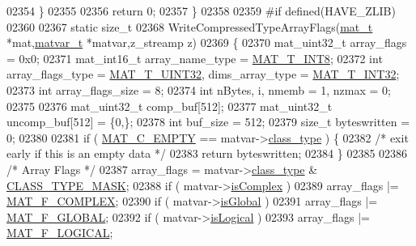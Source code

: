 \begin{DoxyCode}
{{{{{{{{{{{{{{{{02354     \}
02355 
02356     \textcolor{keywordflow}{return} 0;
02357 \}
02358 
02359 \textcolor{preprocessor}{#if defined(HAVE\_ZLIB)}
02360 
02367 \textcolor{keyword}{static} \textcolor{keywordtype}{size\_t}
02368 WriteCompressedTypeArrayFlags(\hyperlink{struct__mat__t}{mat\_t} *mat,\hyperlink{group___m_a_t_structmatvar__t}{matvar\_t} *matvar,z\_streamp z)
02369 \{
02370     mat\_uint32\_t array\_flags = 0x0;
02371     mat\_int16\_t  array\_name\_type = \hyperlink{group___m_a_t_ggacf7b3b879282b7ab3a51190e49bf3453a9807f5033ed4f9b548953742d9fd1658}{MAT\_T\_INT8};
02372     \textcolor{keywordtype}{int} array\_flags\_type = \hyperlink{group___m_a_t_ggacf7b3b879282b7ab3a51190e49bf3453aa397e285a23fe240368b752897652c6a}{MAT\_T\_UINT32}, dims\_array\_type = 
      \hyperlink{group___m_a_t_ggacf7b3b879282b7ab3a51190e49bf3453a83e06a68320726c6572bfbb9f3addb1d}{MAT\_T\_INT32};
02373     \textcolor{keywordtype}{int} array\_flags\_size = 8;
02374     \textcolor{keywordtype}{int} nBytes, i, nmemb = 1, nzmax = 0;
02375 
02376     mat\_uint32\_t comp\_buf[512];
02377     mat\_uint32\_t uncomp\_buf[512] = \{0,\};
02378     \textcolor{keywordtype}{int} buf\_size = 512;
02379     \textcolor{keywordtype}{size\_t} byteswritten = 0;
02380 
02381     \textcolor{keywordflow}{if} ( \hyperlink{group___m_a_t_ggad4d60ae7b709fc81bfd744fb4c857c40a5c76eef0ca0373d25abe49053be6fa9a}{MAT\_C\_EMPTY} == matvar->\hyperlink{group___m_a_t_aff13035bf3265dd7d9425e5d40c839d4}{class\_type} ) \{
02382         \textcolor{comment}{/* exit early if this is an empty data */}
02383         \textcolor{keywordflow}{return} byteswritten;
02384     \}
02385 
02386     \textcolor{comment}{/* Array Flags */}
02387     array\_flags = matvar->\hyperlink{group___m_a_t_aff13035bf3265dd7d9425e5d40c839d4}{class\_type} & \hyperlink{mat5_8c_a24b94e17e9c34b9c795798099c710751}{CLASS\_TYPE\_MASK};
02388     \textcolor{keywordflow}{if} ( matvar->\hyperlink{group___m_a_t_aeb03b3a69f108dc05470b00443a43739}{isComplex} )
02389         array\_flags |= \hyperlink{group___m_a_t_ggab9d6ef9e3ddca78a317b173f01d53fbbacd7b091a11184aad7fc6078c04470780}{MAT\_F\_COMPLEX};
02390     \textcolor{keywordflow}{if} ( matvar->\hyperlink{group___m_a_t_af26c71c4c0ddb14931d15910dddac1bc}{isGlobal} )
02391         array\_flags |= \hyperlink{group___m_a_t_ggab9d6ef9e3ddca78a317b173f01d53fbba49084e0c796aa7963e53f7539525d40d}{MAT\_F\_GLOBAL};
02392     \textcolor{keywordflow}{if} ( matvar->\hyperlink{group___m_a_t_a866c1539e68073a837833d74cd4a65be}{isLogical} )
02393         array\_flags |= \hyperlink{group___m_a_t_ggab9d6ef9e3ddca78a317b173f01d53fbba57eb5c6e200bcbc0f1b7982f29a169c2}{MAT\_F\_LOGICAL};
}}}}}}}}}}}}}}}}
\end{DoxyCode}
